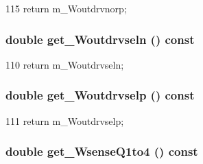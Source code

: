 \begin{DoxyCode}
115 { return m_Woutdrvnorp; }
\end{DoxyCode}
\hypertarget{classTechParameter_a36bd3962b2b2552ed33eea4002a50fcf}{
\subsubsection[{get\_\-Woutdrvseln}]{\setlength{\rightskip}{0pt plus 5cm}double get\_\-Woutdrvseln () const}}
\label{classTechParameter_a36bd3962b2b2552ed33eea4002a50fcf}



\begin{DoxyCode}
110 { return m_Woutdrvseln; }
\end{DoxyCode}
\hypertarget{classTechParameter_a939a9e65f510ab907eaf02e64b20f63a}{
\subsubsection[{get\_\-Woutdrvselp}]{\setlength{\rightskip}{0pt plus 5cm}double get\_\-Woutdrvselp () const}}
\label{classTechParameter_a939a9e65f510ab907eaf02e64b20f63a}



\begin{DoxyCode}
111 { return m_Woutdrvselp; }
\end{DoxyCode}
\hypertarget{classTechParameter_aac5dd5fcf5c87ca906df86291eb618c6}{
\subsubsection[{get\_\-WsenseQ1to4}]{\setlength{\rightskip}{0pt plus 5cm}double get\_\-WsenseQ1to4 () const}}
\label{classTechParameter_aac5dd5fcf5c87ca906df86291eb618c6}



